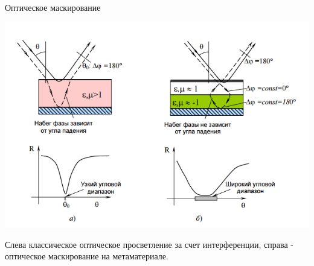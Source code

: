 \documentclass[9pt, compress, xcolor=table]{beamer}
\begin{document}
\begin{frame}{Оптическое маскирование}
    \begin{center}
\includegraphics[width=\textwidth
]{mask}
\end{center}
Слева классическое оптическое просветление за счет интерференции, справа - оптическое маскирование на метаматериале.

\end{frame}
\end{document}
